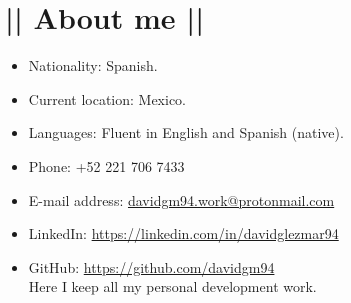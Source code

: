 \section*{|| About me ||}
\begin{itemize}
	\item Nationality: Spanish.
	\item Current location: Mexico.
	\item Languages: Fluent in English and Spanish (native).
	\item Phone: +52 221 706 7433
	\item E-mail address: \href{mailto:davidgm94.work@protonmail.com}{davidgm94.work@protonmail.com}
	\item LinkedIn: \href{https://linkedin.com/in/davidglezmar94}{https://linkedin.com/in/davidglezmar94}
	\item GitHub: \href{https://github.com/davidgm94}{https://github.com/davidgm94}\\Here I keep all my personal development work.
\end{itemize}